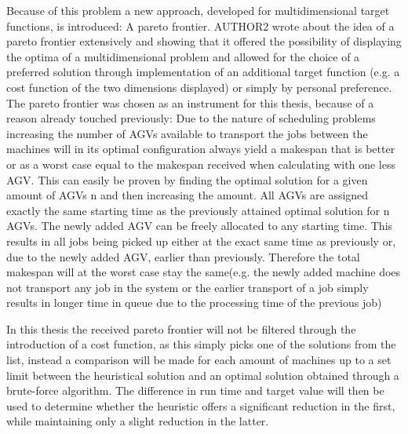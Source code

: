 Because of this problem a new approach, developed for multidimensional target functions, is introduced: A pareto frontier. AUTHOR2 wrote about the
idea of a pareto frontier extensively and showing that it offered the possibility of displaying the optima of a multidimensional problem and allowed
for the choice of a preferred solution through implementation of an additional target function (e.g. a cost function of the two dimensions
displayed) or simply by personal preference. The pareto frontier was chosen as an instrument for this thesis, because of a reason already touched
previously: Due to the nature of scheduling problems increasing the number of AGVs available to transport the jobs between the machines will in
its optimal configuration always yield a makespan that is better or as a worst case equal to the makespan received when calculating with one less
AGV. This can easily be proven by finding the optimal solution for a given amount of AGVs n and then increasing the amount. All AGVs are assigned
exactly the same starting time as the previously attained optimal solution for n AGVs. The newly added AGV can be freely allocated to any starting
time. This results in all jobs being picked up either at the exact same time as previously or, due to the newly added AGV, earlier than previously.
Therefore the total makespan will at the worst case stay the same(e.g. the newly added machine does not transport any job in the system or the
earlier transport of a job simply results in longer time in queue due to the processing time of the previous job)

In this thesis the received pareto frontier will not be filtered through the introduction of a cost function, as this simply picks one of the solutions
from the list, instead a comparison will be made for each amount of machines up to a set limit between the heuristical solution and an optimal
solution obtained through a brute-force algorithm. The difference in run time and target value will then be used to determine whether the heuristic
offers a significant reduction in the first, while maintaining only a slight reduction in the latter.